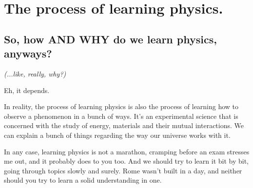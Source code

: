 \documentclass[11pt,fleqn]{book} %
\begin{document}


\pagestyle{empty} %

\tableofcontents %


\pagestyle{fancy} %




\printglossaries




\chapter{The process of learning physics.}

\section{So, how \textbf{AND WHY} do we learn physics, anyways?}
\begin{flushright}
    \textit{(...like, really, why?)}
\end{flushright}

Eh, it depends.

\noindent In reality, the process of learning physics is also the process of learning how to 
observe a phenomenon in a bunch of ways. It's an experimental science that is concerned with the
study of energy, materials and their mutual interactions. We can explain a bunch of things regarding
the way our universe works with it. 

In any case, learning physics is not a marathon, cramping before an exam stresses me out, and it probably does
to you too. And we should try to learn it bit by bit, going through topics slowly and surely. Rome wasn't built in
a day, and neither should you try to learn a solid understanding in one.
\end{document}
